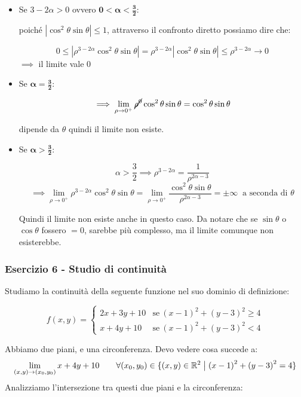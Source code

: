 \begin{itemize}
    \item Se \(3-2\alpha > 0\) ovvero \(\bm{0<\alpha < \frac{3}{2}}\):

          poiché \(\left\vert \cos^{2}\theta \sin\theta \right\vert \le 1\), attraverso il confronto diretto possiamo dire che:

          \[
              0 \le \left\vert\rho^{3-2\alpha}\cos^{2}\theta \sin\theta\right\vert = \rho^{3-2\alpha}\left\vert\cos^{2}\theta \sin\theta\right\vert \le \rho^{3-2\alpha} \to 0
          \]
          \(\implies \) il limite vale 0
    \item Se \(\bm{\alpha = \frac{3}{2}}\):

          \[
              \implies \lim_{\rho \to 0^+} \cancel{\rho^0} \cos^{2}\theta \sin\theta = \cos^{2}\theta \sin\theta
          \]

          dipende da \(\theta \) quindi il limite non esiste.
    \item Se \(\bm{\alpha > \frac{3}{2}}\):

          \[
              \alpha > \frac{3}{2} \implies \rho^{3-2\alpha} = \frac{1}{\rho^{2\alpha-3}}
          \]
          \[
              \implies \lim_{ \rho \to 0^{+} } \rho^{3-2\alpha} \cos^{2}\theta \sin\theta = \lim_{ \rho \to 0^{+} } \frac{\cos^{2}\theta \sin\theta}{\rho^{2\alpha-3}} = \pm \infty \ \text{ a seconda di } \theta
          \]

          Quindi il limite non esiste anche in questo caso. Da notare che se \(\sin\theta \) o \(\cos\theta \) fossero \(=0\), sarebbe più complesso, ma il limite comunque non esisterebbe.

\end{itemize}

\filbreak{}
\subsubsection*{Esercizio 6 {-} Studio di continuità}

Studiamo la continuità della seguente funzione nel suo dominio di definizione:

\[
    f(x,y)=
    \begin{cases}
        2x+3y+10 & \text{se}\ {(x-1)}^{2}+{(y-3)}^{2} \ge 4 \\
        x+4y+10  & \text{se}\ {(x-1)}^{2}+{(y-3)}^{2} < 4
    \end{cases}
\]

Abbiamo due piani, e una circonferenza. Devo vedere cosa succede a:
\[
    \lim_{ (x,y) \to (x_0,y_0) } x+4y+10 \qquad \forall (x_0,y_0) \in \{(x,y) \in \mathbb{R}^2 \;\big|\; {(x-1)}^{2}+{(y-3)}^{2} = 4\}
\]
Analizziamo l'intersezione tra questi due piani e la circonferenza:

